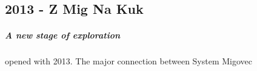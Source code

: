 \begin{tcolorbox}
	\chapter{2013 - Z Mig Na Kuk}
		\paragraph{A new stage of exploration} opened with 2013. The major connection between System Migovec
		\\
		\\
		\\
\end{tcolorbox}
\BgThispage
